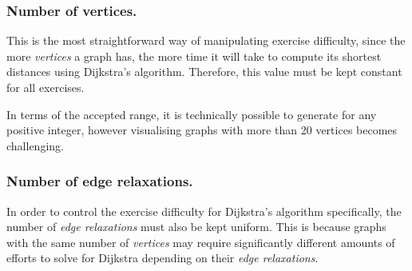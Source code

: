 \documentclass{l4proj}
\begin{document}
\subsubsection{Number of vertices.}

This is the most straightforward way of manipulating exercise difficulty, since the more \emph{vertices} a graph has, the more time it will take to compute its shortest distances using Dijkstra's algorithm. Therefore, this value must be kept constant for all exercises. 

In terms of the accepted range, it is technically possible to generate for any positive integer, however visualising graphs with more than 20 vertices becomes challenging.

\subsubsection{Number of edge relaxations.}
\label{sec:ernum}

In order to control the exercise difficulty for Dijkstra's algorithm specifically, the number of \emph{edge relaxations} must also be kept uniform. This is because graphs with the same number of \emph{vertices} may require significantly different amounts of efforts to solve for Dijkstra depending on their \emph{edge relaxations}. 
\end{document}
